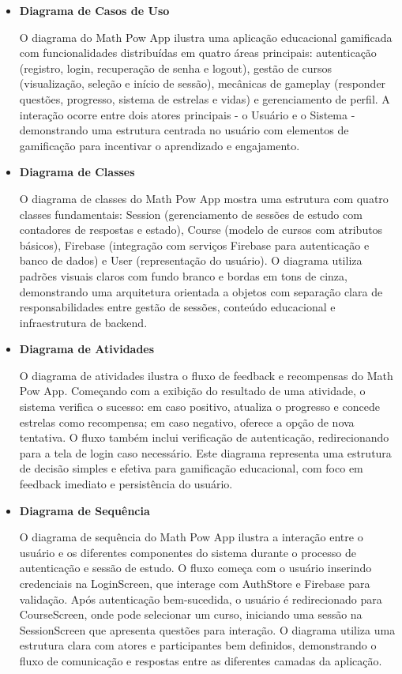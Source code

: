 \begin{itemize}
       \item \textbf{Diagrama de Casos de Uso}
       
O diagrama do Math Pow App ilustra uma aplicação educacional gamificada com funcionalidades distribuídas em quatro áreas principais: autenticação (registro, login, recuperação de senha e logout), gestão de cursos (visualização, seleção e início de sessão), mecânicas de gameplay (responder questões, progresso, sistema de estrelas e vidas) e gerenciamento de perfil. A interação ocorre entre dois atores principais - o Usuário e o Sistema - demonstrando uma estrutura centrada no usuário com elementos de gamificação para incentivar o aprendizado e engajamento.

       

\item \textbf{Diagrama de Classes}

O diagrama de classes do Math Pow App mostra uma estrutura com quatro classes fundamentais: Session (gerenciamento de sessões de estudo com contadores de respostas e estado), Course (modelo de cursos com atributos básicos), Firebase (integração com serviços Firebase para autenticação e banco de dados) e User (representação do usuário). O diagrama utiliza padrões visuais claros com fundo branco e bordas em tons de cinza, demonstrando uma arquitetura orientada a objetos com separação clara de responsabilidades entre gestão de sessões, conteúdo educacional e infraestrutura de backend.



\item \textbf{Diagrama de Atividades}

O diagrama de atividades ilustra o fluxo de feedback e recompensas do Math Pow App. Começando com a exibição do resultado de uma atividade, o sistema verifica o sucesso: em caso positivo, atualiza o progresso e concede estrelas como recompensa; em caso negativo, oferece a opção de nova tentativa. O fluxo também inclui verificação de autenticação, redirecionando para a tela de login caso necessário. Este diagrama representa uma estrutura de decisão simples e efetiva para gamificação educacional, com foco em feedback imediato e persistência do usuário.


\item \textbf{Diagrama de Sequência}

O diagrama de sequência do Math Pow App ilustra a interação entre o usuário e os diferentes componentes do sistema durante o processo de autenticação e sessão de estudo. O fluxo começa com o usuário inserindo credenciais na LoginScreen, que interage com AuthStore e Firebase para validação. Após autenticação bem-sucedida, o usuário é redirecionado para CourseScreen, onde pode selecionar um curso, iniciando uma sessão na SessionScreen que apresenta questões para interação. O diagrama utiliza uma estrutura clara com atores e participantes bem definidos, demonstrando o fluxo de comunicação e respostas entre as diferentes camadas da aplicação.

\end{itemize}

